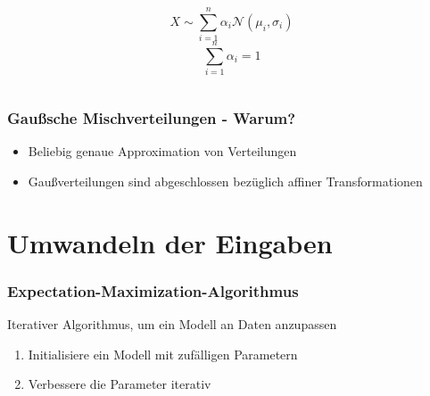 \documentclass[11pt]{beamer}
\begin{document}
\begin{frame}
\begin{columns}[T]
\begin{column}{.5\textwidth}
\begin{figure}
      \end{figure}
      \begin{equation*}
        X \sim \sum_{i = 1}^{n} \alpha_{i} \mathcal{N}(\mu_{i}, \sigma_{i})
      \end{equation*}
      \begin{equation*}
        \sum_{i = 1}^{n} \alpha_{i} = 1
      \end{equation*}
    \end{column}
  \end{columns}
\end{frame}

\begin{frame}
  \frametitle{Gaußsche Mischverteilungen - Warum?}
  \begin{itemize}
  \item Beliebig genaue Approximation von Verteilungen
  \item Gaußverteilungen sind abgeschlossen bezüglich affiner Transformationen
  \end{itemize}
\end{frame}

\section{Umwandeln der Eingaben}

\begin{frame}
  \frametitle{Expectation-Maximization-Algorithmus}
  Iterativer Algorithmus, um ein Modell an Daten anzupassen
  \vspace{2em}
  \begin{enumerate}
  \item Initialisiere ein Modell mit zufälligen Parametern
  \item Verbessere die Parameter iterativ
  \end{enumerate}
\end{frame}
\end{document}
